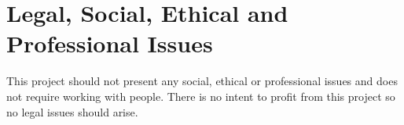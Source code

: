 \documentclass[a4paper,fleqn,12pt]{article}
\begin{document}
	\section{Legal, Social, Ethical and Professional Issues}
	This project should not present any social, ethical or professional issues and does not require working with people. There is no intent to profit from this project so no legal issues should arise.
	
	
	
	
\end{document}
